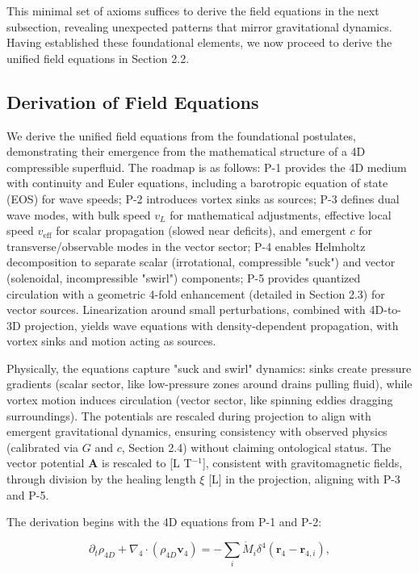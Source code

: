 This minimal set of axioms suffices to derive the field equations in the next subsection, revealing unexpected patterns that mirror gravitational dynamics. Having established these foundational elements, we now proceed to derive the unified field equations in Section 2.2.

\subsection{Derivation of Field Equations}

We derive the unified field equations from the foundational postulates, demonstrating their emergence from the mathematical structure of a 4D compressible superfluid. The roadmap is as follows: P-1 provides the 4D medium with continuity and Euler equations, including a barotropic equation of state (EOS) for wave speeds; P-2 introduces vortex sinks as sources; P-3 defines dual wave modes, with bulk speed $v_L$ for mathematical adjustments, effective local speed $v_{\text{eff}}$ for scalar propagation (slowed near deficits), and emergent $c$ for transverse/observable modes in the vector sector; P-4 enables Helmholtz decomposition to separate scalar (irrotational, compressible "suck") and vector (solenoidal, incompressible "swirl") components; P-5 provides quantized circulation with a geometric 4-fold enhancement (detailed in Section 2.3) for vector sources. Linearization around small perturbations, combined with 4D-to-3D projection, yields wave equations with density-dependent propagation, with vortex sinks and motion acting as sources.

Physically, the equations capture "suck and swirl" dynamics: sinks create pressure gradients (scalar sector, like low-pressure zones around drains pulling fluid), while vortex motion induces circulation (vector sector, like spinning eddies dragging surroundings). The potentials are rescaled during projection to align with emergent gravitational dynamics, ensuring consistency with observed physics (calibrated via $G$ and $c$, Section 2.4) without claiming ontological status. The vector potential $\mathbf{A}$ is rescaled to [L T$^{-1}$], consistent with gravitomagnetic fields, through division by the healing length $\xi$ [L] in the projection, aligning with P-3 and P-5.

The derivation begins with the 4D equations from P-1 and P-2:

\begin{equation}
\partial_t \rho_{4D} + \nabla_4 \cdot (\rho_{4D} \mathbf{v}_4) = -\sum_i \dot{M}_i \delta^4(\mathbf{r}_4 - \mathbf{r}_{4,i}),
\end{equation}

